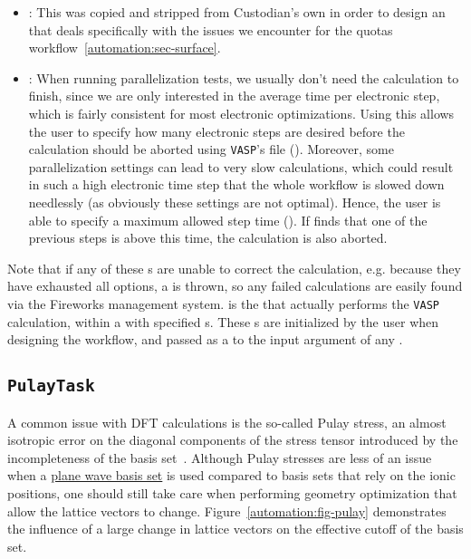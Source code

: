 \begin{refsection}
\begin{itemize}

\item {}: This  was copied and stripped from Custodian's own  in order to design an  that deals specifically with the issues we encounter for the quotas workflow~\ref{automation:sec-surface}.

\item {}: When running parallelization tests, we usually don't need the calculation to finish, since we are only interested in the average time per electronic step, which is fairly consistent for most electronic optimizations. Using this  allows the user to specify how many electronic steps are desired before the calculation should be aborted using \texttt{VASP}'s  file (). Moreover, some parallelization settings can lead to very slow calculations, which could result in such a high electronic time step that the whole workflow is slowed down needlessly (as obviously these settings are not optimal). Hence, the user is able to specify a maximum allowed step time (). If  finds that one of the previous steps is above this time, the calculation is also aborted.

\end{itemize}

Note that if any of these s are unable to correct the calculation, e.g. because they have exhausted all options, a  is thrown, so any failed calculations are easily found via the Fireworks management system.  is the  that actually performs the \texttt{VASP} calculation, within a  with specified s. These s are initialized by the user when designing the workflow, and passed as a  to the  input argument of any .

\subsection{\texttt{PulayTask}} \label{automation:sec-PulayTask}

A common issue with DFT calculations is the so-called Pulay stress, an almost isotropic error on the diagonal components of the stress tensor introduced by the incompleteness of the basis set~\cite{Francis1990}. Although Pulay stresses are less of an issue when a \hyperref[dft:sec-planewave]{plane wave basis set} is used compared to basis sets that rely on the ionic positions, one should still take care when performing geometry optimization that allow the lattice vectors to change. Figure~\ref{automation:fig-pulay} demonstrates the influence of a large change in lattice vectors on the effective cutoff of the basis set. 


\end{refsection}
